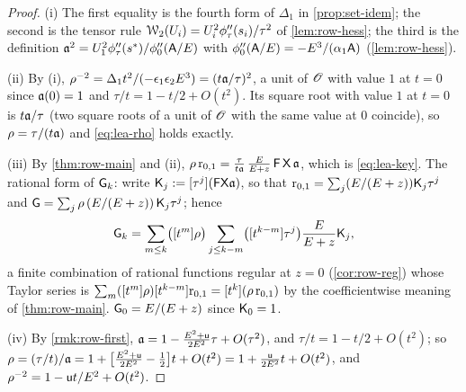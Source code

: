 \begin{proof}
(i) The first equality is the fourth form of $\Delta_1$ in \cref{prop:set-idem}; the second is the tensor rule $\mathcal{W}_2(U_i) = U_i^2\phi_\tau''(s_i)/\tau^2$ of \cref{lem:row-hess}; the third is the definition $\mathfrak{a}^2 = U_1^2\phi_\tau''(s^{\ast})/\phi_0''(\mathsf{A}/E)$ with $\phi_0''(\mathsf{A}/E) = -E^3/(\alpha_1\mathsf{A})$ (\cref{lem:row-hess}).

(ii) By (i), $\rho^{-2} = \Delta_1t^2/(-\epsilon_1\epsilon_2E^3) = (t\mathfrak{a}/\tau)^2$, a unit of $\mathscr{O}$ with value $1$ at $t = 0$ since $\mathfrak{a}(0) = 1$ and $\tau/t = 1 - t/2 + O(t^2)$. Its square root with value $1$ at $t = 0$ is $t\mathfrak{a}/\tau$ (two square roots of a unit of $\mathscr{O}$ with the same value at $0$ coincide), so $\rho = \tau/(t\mathfrak{a})$ and \eqref{eq:lea-rho} holds exactly.

(iii) By \cref{thm:row-main} and (ii), $\rho\,\mathrm{r}_{0,1} = \frac{\tau}{t\mathfrak{a}}\,\frac{E}{E+z}\,\mathsf{F}\,\mathsf{X}\,\mathfrak{a}$, which is \eqref{eq:lea-key}. The rational form of $\mathsf{G}_k$: write $\mathsf{K}_j := [\tau^j](\mathsf{F}\mathsf{X}\mathfrak{a})$, so that $\mathrm{r}_{0,1} = \sum_j(E/(E+z))\mathsf{K}_j\tau^j$ and $\mathsf{G} = \sum_j\rho\,(E/(E+z))\,\mathsf{K}_j\tau^j$; hence
\[
\mathsf{G}_k = \sum_{m\leq k}\bigl([t^m]\rho\bigr)\sum_{j\leq k-m}\bigl([t^{k-m}]\tau^j\bigr)\frac{E}{E+z}\mathsf{K}_j ,
\]
a finite combination of rational functions regular at $z = 0$ (\cref{cor:row-reg}) whose Taylor series is $\sum_m([t^m]\rho)[t^{k-m}]\mathrm{r}_{0,1} = [t^k](\rho\,\mathrm{r}_{0,1})$ by the coefficientwise meaning of \cref{thm:row-main}. $\mathsf{G}_0 = E/(E+z)$ since $\mathsf{K}_0 = 1$.

(iv) By \cref{rmk:row-first}, $\mathfrak{a} = 1 - \frac{E^2+\mathsf{u}}{2E^2}\tau + O(\tau^2)$, and $\tau/t = 1 - t/2 + O(t^2)$; so $\rho = (\tau/t)/\mathfrak{a} = 1 + \bigl[\frac{E^2+\mathsf{u}}{2E^2} - \frac12\bigr]t + O(t^2) = 1 + \frac{\mathsf{u}}{2E^2}t + O(t^2)$, and $\rho^{-2} = 1 - \mathsf{u} t/E^2 + O(t^2)$.
\end{proof}


